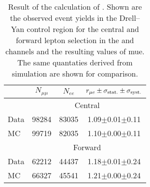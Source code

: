 
\begin{table}[hbtp]
 \renewcommand{\arraystretch}{1.3}
 \setlength{\belowcaptionskip}{6pt}
 \centering
 \caption{Result of the calculation of \rmue. Shown are the observed event yields in the Drell--Yan control region for the central and forward lepton selection in the \EE and \MM channels and the resulting values of 
mue. The same quantaties derived from simulation are shown for comparison.}
  \label{tab:rMuE}
  \begin{tabular}{l| ccc }

    							& $N_{\mu\mu}$ &  $N_{ee}$ & $r_{\mu e} \pm \sigma_{\text{stat.}} \pm \sigma_{\text{syst.}}$ \\ 
    
    \hline
    							& \multicolumn{3}{c}{Central}  \\ 

    \hline
        Data       &  98284                   & 83035              &  1.09$\pm$0.01$\pm$0.11    \\

        MC       &  99719                   & 82035              &  1.10$\pm$0.00$\pm$0.11    \\

\hline
    							& \multicolumn{3}{c}{Forward}  \\ 

    \hline
        Data       &  62212                   & 44437              &  1.18$\pm$0.01$\pm$0.24    \\

        MC       &  66327                   & 45541              &  1.21$\pm$0.00$\pm$0.24    \\

  \end{tabular}
\end{table}


